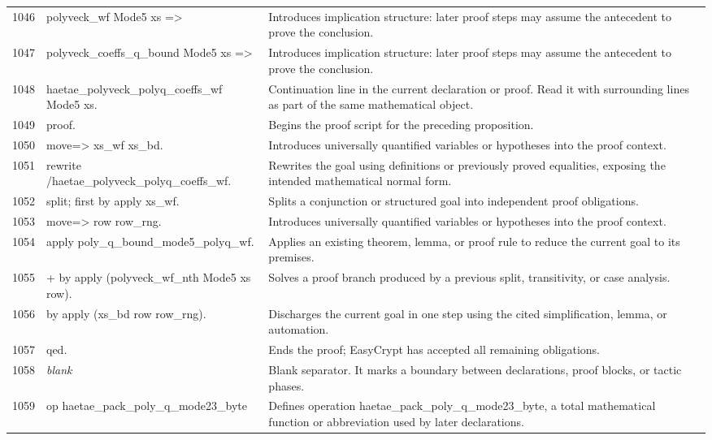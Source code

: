 \documentclass[10pt]{article}
\begin{document}
\begin{longtable}{r L{0.53\textwidth} L{0.37\textwidth}}
1046 & {\ttfamily\scriptsize   polyveck\_wf Mode5 xs =>} & Introduces implication structure: later proof steps may assume the antecedent to prove the conclusion. \\
1047 & {\ttfamily\scriptsize   polyveck\_coeffs\_q\_bound Mode5 xs =>} & Introduces implication structure: later proof steps may assume the antecedent to prove the conclusion. \\
1048 & {\ttfamily\scriptsize   haetae\_polyveck\_polyq\_coeffs\_wf Mode5 xs.} & Continuation line in the current declaration or proof.  Read it with surrounding lines as part of the same mathematical object. \\
1049 & {\ttfamily\scriptsize proof.} & Begins the proof script for the preceding proposition. \\
1050 & {\ttfamily\scriptsize move=> xs\_wf xs\_bd.} & Introduces universally quantified variables or hypotheses into the proof context. \\
1051 & {\ttfamily\scriptsize rewrite /haetae\_polyveck\_polyq\_coeffs\_wf.} & Rewrites the goal using definitions or previously proved equalities, exposing the intended mathematical normal form. \\
1052 & {\ttfamily\scriptsize split; first by apply xs\_wf.} & Splits a conjunction or structured goal into independent proof obligations. \\
1053 & {\ttfamily\scriptsize move=> row row\_rng.} & Introduces universally quantified variables or hypotheses into the proof context. \\
1054 & {\ttfamily\scriptsize apply poly\_q\_bound\_mode5\_polyq\_wf.} & Applies an existing theorem, lemma, or proof rule to reduce the current goal to its premises. \\
1055 & {\ttfamily\scriptsize + by apply (polyveck\_wf\_nth Mode5 xs row).} & Solves a proof branch produced by a previous split, transitivity, or case analysis. \\
1056 & {\ttfamily\scriptsize by apply (xs\_bd row row\_rng).} & Discharges the current goal in one step using the cited simplification, lemma, or automation. \\
1057 & {\ttfamily\scriptsize qed.} & Ends the proof; EasyCrypt has accepted all remaining obligations. \\
1058 & {\ttfamily\scriptsize \emph{blank}} & Blank separator.  It marks a boundary between declarations, proof blocks, or tactic phases. \\
1059 & {\ttfamily\scriptsize op haetae\_pack\_poly\_q\_mode23\_byte} & Defines operation haetae\_pack\_poly\_q\_mode23\_byte, a total mathematical function or abbreviation used by later declarations. \\

\end{longtable}
\end{document}
